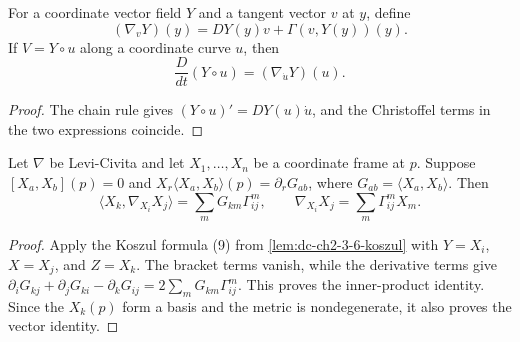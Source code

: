 \begin{lemma}
  \label{lem:dc-ch2-2-2-c-coord}


  For a coordinate vector field $Y$ and a tangent vector $v$ at $y$, define
  \[
    (\nabla_vY)(y)=DY(y)v+\Gamma(v,Y(y))(y).
  \]
  If $V=Y\circ u$ along a coordinate curve $u$, then
  \[
    \frac{D}{dt}(Y\circ u)=(\nabla_{\dot u}Y)(u).
  \]
\end{lemma}
\begin{proof}

  \sketch
  The chain rule gives $(Y\circ u)'=DY(u)\dot u$, and the Christoffel terms in
  the two expressions coincide.
\end{proof}

\begin{lemma}
  \label{lem:dc-ch2-2-2-c-formula10}


  Let $\nabla$ be Levi-Civita and let $X_1,\dots,X_n$ be a coordinate frame at
  $p$. Suppose $[X_a,X_b](p)=0$ and
  $X_r\langle X_a,X_b\rangle(p)=\partial_rG_{ab}$, where
  $G_{ab}=\langle X_a,X_b\rangle$. Then
  \[
    \langle X_k,\nabla_{X_i}X_j\rangle
      =\sum_mG_{km}\Gamma^m_{ij},
    \qquad
    \nabla_{X_i}X_j=\sum_m\Gamma^m_{ij}X_m.\tag{10}
  \]
  \end{lemma}
\begin{proof}

    \sketch
    Apply the Koszul formula (9) from \cref{lem:dc-ch2-3-6-koszul} with
    $Y=X_i$, $X=X_j$, and $Z=X_k$. The bracket terms vanish, while the derivative
    terms give
    $\partial_iG_{kj}+\partial_jG_{ki}-\partial_kG_{ij}
      =2\sum_mG_{km}\Gamma^m_{ij}$.
    This proves the inner-product identity. Since the $X_k(p)$ form a basis and
    the metric is nondegenerate, it also proves the vector identity.
  \end{proof}

